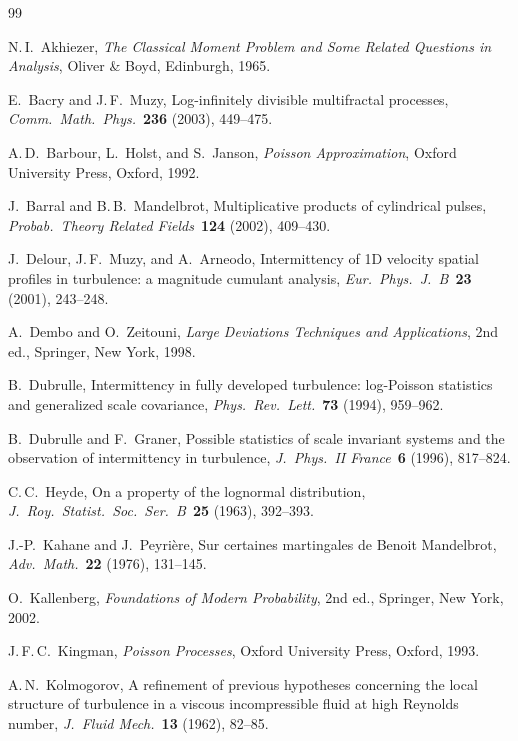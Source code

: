 \documentclass[12pt]{amsart}
\theoremstyle{definition}
\theoremstyle{remark}
\begin{document}
\begin{thebibliography}{99}

N.\,I.\ Akhiezer,
\textit{The Classical Moment Problem and Some Related Questions in
Analysis},
Oliver \& Boyd, Edinburgh, 1965.

E.\ Bacry and J.\,F.\ Muzy,
Log-infinitely divisible multifractal processes,
\textit{Comm.\ Math.\ Phys.}\ \textbf{236} (2003), 449--475.

A.\,D.\ Barbour, L.\ Holst, and S.\ Janson,
\textit{Poisson Approximation},
Oxford University Press, Oxford, 1992.

J.\ Barral and B.\,B.\ Mandelbrot,
Multiplicative products of cylindrical pulses,
\textit{Probab.\ Theory Related Fields}\ \textbf{124} (2002),
409--430.

J.\ Delour, J.\,F.\ Muzy, and A.\ Arneodo,
Intermittency of 1D velocity spatial profiles in turbulence: a
magnitude cumulant analysis,
\textit{Eur.\ Phys.\ J.\ B}\ \textbf{23} (2001), 243--248.

A.\ Dembo and O.\ Zeitouni,
\textit{Large Deviations Techniques and Applications},
2nd ed., Springer, New York, 1998.

B.\ Dubrulle,
Intermittency in fully developed turbulence: log-Poisson statistics
and generalized scale covariance,
\textit{Phys.\ Rev.\ Lett.}\ \textbf{73} (1994), 959--962.

B.\ Dubrulle and F.\ Graner,
Possible statistics of scale invariant systems and the observation of
intermittency in turbulence,
\textit{J.\ Phys.\ II France}\ \textbf{6} (1996), 817--824.

C.\,C.\ Heyde,
On a property of the lognormal distribution,
\textit{J.\ Roy.\ Statist.\ Soc.\ Ser.\ B}\ \textbf{25} (1963),
392--393.

J.-P.\ Kahane and J.\ Peyri\`ere,
Sur certaines martingales de Benoit Mandelbrot,
\textit{Adv.\ Math.}\ \textbf{22} (1976), 131--145.

O.\ Kallenberg,
\textit{Foundations of Modern Probability},
2nd ed., Springer, New York, 2002.

J.\,F.\,C.\ Kingman,
\textit{Poisson Processes},
Oxford University Press, Oxford, 1993.

A.\,N.\ Kolmogorov,
A refinement of previous hypotheses concerning the local structure of
turbulence in a viscous incompressible fluid at high Reynolds number,
\textit{J.\ Fluid Mech.}\ \textbf{13} (1962), 82--85.


\end{thebibliography}
\end{document}
